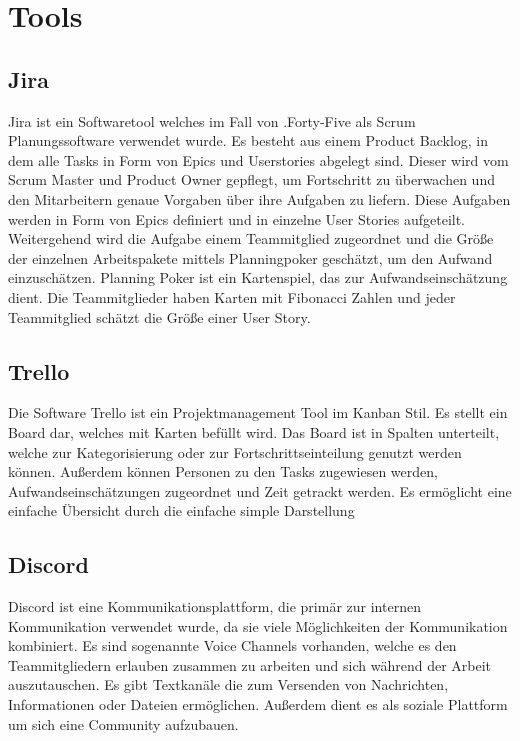 
%


\section{Tools}\label{sec:tools}

\renewcommand{\kapitelautor}{Autor: Nils} %

\subsection{Jira}\label{subsec:jira}
%
Jira ist ein Softwaretool welches im Fall von .Forty-Five als Scrum Planungssoftware verwendet wurde.
Es besteht aus einem Product Backlog, in dem alle Tasks in Form von Epics und Userstories abgelegt sind.
Dieser wird vom Scrum Master und Product Owner gepflegt, um Fortschritt zu überwachen und den Mitarbeitern genaue Vorgaben über ihre Aufgaben zu liefern.
Diese Aufgaben werden in Form von Epics definiert und in einzelne User Stories aufgeteilt.
Weitergehend wird die Aufgabe einem Teammitglied zugeordnet und die Größe der einzelnen Arbeitspakete mittels Planningpoker geschätzt, um den Aufwand einzuschätzen.
Planning Poker ist ein Kartenspiel, das zur Aufwandseinschätzung dient. Die Teammitglieder haben Karten mit Fibonacci Zahlen und jeder Teammitglied schätzt die Größe einer User Story.



\subsection{Trello}\label{subsec:Trello}
%
Die Software Trello ist ein Projektmanagement Tool im Kanban Stil. Es stellt ein Board dar, welches mit Karten befüllt wird.
Das Board ist in Spalten unterteilt, welche zur Kategorisierung oder zur Fortschrittseinteilung genutzt werden können.
Außerdem können Personen zu den Tasks zugewiesen werden, Aufwandseinschätzungen zugeordnet und Zeit getrackt werden.
Es ermöglicht eine einfache Übersicht durch die einfache simple Darstellung
%
\subsection{Discord}\label{subsec:Discord}
Discord ist eine Kommunikationsplattform, die primär zur internen Kommunikation verwendet wurde, da sie viele Möglichkeiten der Kommunikation kombiniert.
Es sind sogenannte Voice Channels vorhanden, welche es den Teammitgliedern erlauben zusammen zu arbeiten und sich während der Arbeit auszutauschen.
Es gibt Textkanäle die zum Versenden von Nachrichten, Informationen oder Dateien ermöglichen. Außerdem dient es als soziale Plattform um sich eine Community aufzubauen.

%

\renewcommand{\kapitelautor}{}
